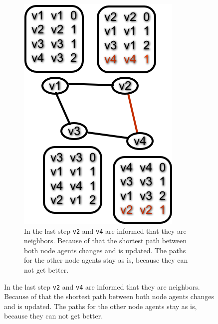 \begin{figure}
\begin{subfigure}{.45\textwidth}
        \includegraphics[width=\textwidth] {images/dv5.png}
        \caption{In the last step \texttt{v2} and \texttt{v4} are informed that they are neighbors. Because of that the shortest path between both node agents changes and is updated. The paths for the other node agents stay as is, because they can not get better. }
    \end{subfigure}
\end{figure}

